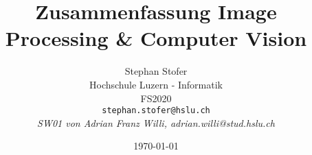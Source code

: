 \documentclass[11pt,twoside]{article}
\title{Zusammenfassung Image Processing \& Computer Vision}
\author{Stephan Stofer\\
	Hochschule Luzern - Informatik\\
	FS2020\\
	\texttt{stephan.stofer@hslu.ch}\\
	\emph{SW01 von Adrian Franz Willi, adrian.willi@stud.hslu.ch}}
\date{\today}
\begin{document}
 
\maketitle
\tableofcontents{}




 
\end{document}
